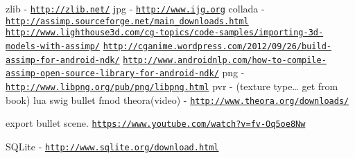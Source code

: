 zlib -\/ \href{http://zlib.net/}{\tt http\+://zlib.\+net/} jpg -\/ \href{http://www.ijg.org}{\tt http\+://www.\+ijg.\+org} collada -\/ \href{http://assimp.sourceforge.net/main_downloads.html}{\tt http\+://assimp.\+sourceforge.\+net/main\+\_\+downloads.\+html} \href{http://www.lighthouse3d.com/cg-topics/code-samples/importing-3d-models-with-assimp/}{\tt http\+://www.\+lighthouse3d.\+com/cg-\/topics/code-\/samples/importing-\/3d-\/models-\/with-\/assimp/} \href{http://cganime.wordpress.com/2012/09/26/build-assimp-for-android-ndk/}{\tt http\+://cganime.\+wordpress.\+com/2012/09/26/build-\/assimp-\/for-\/android-\/ndk/} \href{http://www.androidnlp.com/how-to-compile-assimp-open-source-library-for-android-ndk/}{\tt http\+://www.\+androidnlp.\+com/how-\/to-\/compile-\/assimp-\/open-\/source-\/library-\/for-\/android-\/ndk/} png -\/ \href{http://www.libpng.org/pub/png/libpng.html}{\tt http\+://www.\+libpng.\+org/pub/png/libpng.\+html} pvr -\/ (texture type… get from book) lua swig bullet fmod theora(video) -\/ \href{http://www.theora.org/downloads/}{\tt http\+://www.\+theora.\+org/downloads/}

export bullet scene. \href{https://www.youtube.com/watch?v=fv-Oq5oe8Nw}{\tt https\+://www.\+youtube.\+com/watch?v=fv-\/\+Oq5oe8\+Nw}

S\+Q\+Lite -\/ \href{http://www.sqlite.org/download.html}{\tt http\+://www.\+sqlite.\+org/download.\+html} 